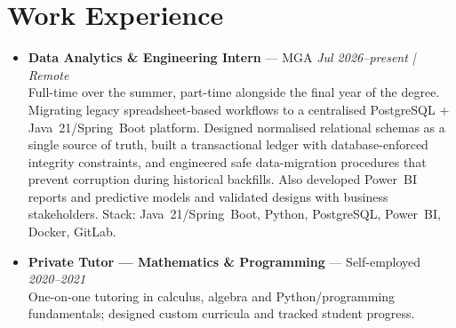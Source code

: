 \documentclass[10pt,a4paper]{article}
\begin{document}
\section{Work Experience}
{\small
\begin{itemize}

  \item \textbf{Data Analytics \& Engineering Intern} --- MGA \hfill \textit{Jul 2026--present | Remote}\\
  Full-time over the summer, part-time alongside the final year of the degree. Migrating legacy spreadsheet-based workflows to a centralised PostgreSQL + Java~21/Spring~Boot platform.
  Designed normalised relational schemas as a single source of truth, built a transactional ledger with
  database-enforced integrity constraints, and engineered safe data-migration procedures that prevent
  corruption during historical backfills. Also developed Power~BI reports and predictive models and validated
  designs with business stakeholders. Stack: Java~21/Spring~Boot, Python, PostgreSQL, Power~BI, Docker, GitLab.

  \item \textbf{Private Tutor --- Mathematics \& Programming} --- Self-employed \hfill \textit{2020--2021}\\
  One-on-one tutoring in calculus, algebra and Python/programming fundamentals;
  designed custom curricula and tracked student progress.

\end{itemize}
}

\end{document}
